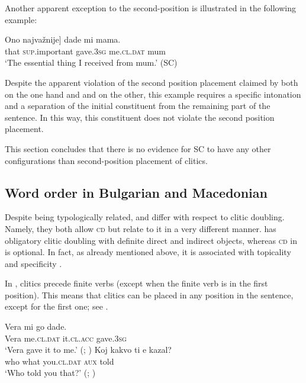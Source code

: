 \documentclass[output=paper,
colorlinks,
citecolor=brown,
newtxmath
]{langscibook}
\begin{document}
Another apparent exception to the second-position is illustrated in the following example:


\ea\label{ex:zivojinovic:23}
\gll\minsp{[} Ono najvažnije]    dade     mi        mama.       \\
    {} that \textsc{sup}.important gave.\textsc{3sg} me.\textsc{cl.dat} mum \\
\glt `The essential thing I received from mum.'
\hfill (SC)
\z

\noindent Despite the apparent violation of the second position placement claimed by both \citet{Franks.King2000} on the one hand and \citet{Boskovic2001} and \citet{Radanovic-Kocic1988} on the other, this example requires a specific intonation and a separation of the initial constituent from the remaining part of the sentence. In this way, this constituent does not violate the second position placement.

This section concludes that there is no evidence for SC to have any other configurations than second-position placement of clitics.

\subsection{Word order in Bulgarian and Macedonian}
\label{subsec:orderBM}
Despite being typologically related,  and  differ with respect to clitic doubling. Namely, they both allow \textsc{cd} but relate to it in a very different manner.  has obligatory clitic doubling with definite direct and indirect objects, whereas \textsc{cd} in  is optional. In fact, as already mentioned above, it is associated with topicality and specificity \citep{Sportiche1996,Cinque.Krapova2008}.

In , clitics precede finite verbs (except when the finite verb is in the first position). This means that clitics can be placed in any position in the sentence, except for the first one; see .


\ea\label{ex:zivojinovic:24}
\gll Vera mi        go         dade.           \\
     Vera me.\textsc{cl.dat} it.\textsc{cl.acc} gave.\textsc{3sg}\\
\glt `Vera gave it to me.'
\hfill (; \citealt[234]{Franks.King2000})
\ex\label{ex:zivojinovic:25}
\gll Koj kakvo ti          e    kazal?                                    \\
     who what  you.\textsc{cl.dat}  \textsc{aux}  told\\
\glt `Who told you that?'
\hfill (; \citealt[461]{rudin1988multiple})
\z
\end{document}
